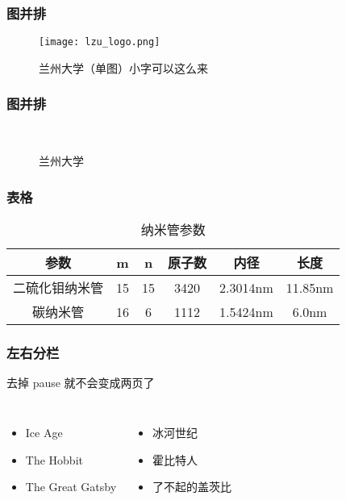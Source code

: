 \documentclass[14pt, AutoFakeBold]{ldr}
\begin{document}
\begin{frame}
  \frametitle{图并排}
  \begin{figure}[H]
    \centering
    \texttt{[image: lzu\_logo.png]}
  
    \caption{兰州大学（单图）\footnotesize 小字可以这么来}
    \label{fig_lzu}
\end{figure}
  
\end{frame}
\begin{frame}
  \frametitle{图并排}
  \begin{figure}[H]
    \centering
    \\
    \caption{兰州大学}
    \label{fig_lzus}
\end{figure}
  
\end{frame}


\begin{frame}
  \frametitle{表格}
  \begin{table}[H]
    \centering
    \caption{纳米管参数}
    \begin{tabular}{cccccc} %
        \toprule
        参数 & m  & n  & 原子数 & 内径     & 长度    \\
        \midrule
        二硫化钼纳米管  & 15 & 15 & 3420   & 2.3014nm & 11.85nm \\
        碳纳米管  & 16 & 6  & 1112   & 1.5424nm & 6.0nm   \\
        \bottomrule
    \end{tabular}
    \label{tbl_mcnt_nanotube}
\end{table}
\end{frame}

\begin{frame}
\frametitle{左右分栏}
去掉 pause  就不会变成两页了
  \begin{columns}

    \begin{itemize}
    \item Ice Age
    \item The Hobbit
    \item The Great Gatsby
    \end{itemize}
  \pause
    \begin{itemize}
    \item 冰河世纪
    \item 霍比特人
    \item 了不起的盖茨比
    \end{itemize}
  \end{columns}
\end{frame}
\end{document}
